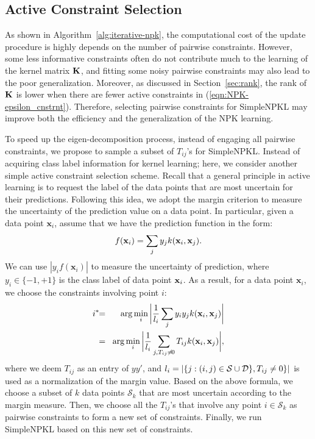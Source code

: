 \subsection{Active Constraint Selection } \label{sec:cnstrnt_slctn}

As shown in Algorithm~\ref{alg:iterative-npk}, the computational cost of the update procedure is highly depends on the number of pairwise constraints. However, some less informative constraints often do not contribute much to the learning of the kernel matrix ${\bf K}$, and fitting some noisy pairwise constraints may also lead to the poor generalization. Moreover, as discussed in Section~\ref{sec:rank}, the rank of ${\bf K}$ is lower when there are fewer active constraints in (\ref{eqn:NPK-epsilon_cnstrnt}). Therefore, selecting pairwise constraints for SimpleNPKL may improve both the efficiency and the generalization of the NPK learning.

To speed up the eigen-decomposition process, instead of engaging all pairwise
constraints, we propose to sample a subset of $T_{ij}$'s for SimpleNPKL.
Instead of acquiring class label information for kernel learning; here, we consider another simple active constraint
selection scheme. Recall that a general principle in active learning is to request the label of the data points that are most uncertain for their predictions. Following this idea, we adopt the margin criterion to measure the uncertainty of the prediction value on a data point. In particular, given a data point $\mathbf{x}_i$, assume that we have the prediction function in the form:
\[f({\bf x}_i)=\sum_j y_j k(\mathbf{x}_i, \mathbf{x}_j).\]
We can
use $|y_i f(\mathbf{x}_i)|$ to measure the uncertainty of prediction, where $ y_i\in\{-1,+1\}$ is
the class label of data point ${\bf x}_i$. As a result, for a data point $\mathbf{x}_i$, we
choose the constraints involving point $i$:
\begin{eqnarray*}
i^*\!&\!=\!&\!\arg\min_i\bigg|\frac{1}{l_i}\sum_j
 y_i y_j k({\bf x}_i, {\bf x}_j) \bigg|\\
&\!=\!&\arg\min_i \bigg|\frac{1}{l_i}\sum_{j, T_{ij}\neq\!0}T_{ij}k({\bf x}_i, {\bf x}_j) \bigg|,
\end{eqnarray*}
where we deem  $T_{ij}$ as an entry of $y y'$, and $l_i=|\{j:(i,j)\in{\cal S}\cup{\cal D}\},
T_{ij}\neq0\}|$ is used as a normalization of the margin value. Based on the above
formula, we choose a subset of $k$ data points $\mathcal{S}_k$ that are most
uncertain according to the margin measure. Then, we choose all the $T_{ij}$'s that
involve any point $i\in\mathcal{S}_k$ as pairwise constraints to form a new set of
constraints. Finally, we run SimpleNPKL based on this new set of constraints.

